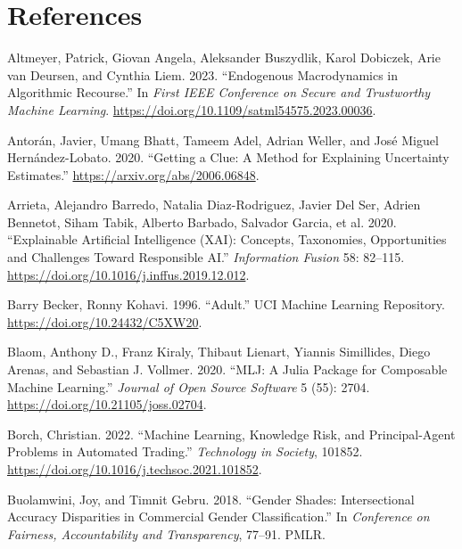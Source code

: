\documentclass{juliacon}
\newlength{\cslhangindent}
\newenvironment{CSLReferences}[2] %
 {\begin{list}{}{%
  \setlength{\itemindent}{0pt}
  \setlength{\leftmargin}{0pt}
  \setlength{\parsep}{0pt}
  \ifodd #1
   \setlength{\leftmargin}{\cslhangindent}
   \setlength{\itemindent}{-1\cslhangindent}
  \fi
  \setlength{\itemsep}{#2\baselineskip}}}
 {\end{list}}
\begin{document}
\section*{References}\label{references}

\label{refs}
\begin{CSLReferences}{1}{0}
Altmeyer, Patrick, Giovan Angela, Aleksander Buszydlik, Karol Dobiczek,
Arie van Deursen, and Cynthia Liem. 2023. {``Endogenous {Macrodynamics}
in {Algorithmic} {Recourse}.''} In \emph{First {IEEE} {Conference} on
{Secure} and {Trustworthy} {Machine} {Learning}}.
\url{https://doi.org/10.1109/satml54575.2023.00036}.

Antorán, Javier, Umang Bhatt, Tameem Adel, Adrian Weller, and José
Miguel Hernández-Lobato. 2020. {``Getting a Clue: {A} Method for
Explaining Uncertainty Estimates.''}
\url{https://arxiv.org/abs/2006.06848}.

Arrieta, Alejandro Barredo, Natalia Diaz-Rodriguez, Javier Del Ser,
Adrien Bennetot, Siham Tabik, Alberto Barbado, Salvador Garcia, et al.
2020. {``Explainable {Artificial Intelligence} ({XAI}): {Concepts},
Taxonomies, Opportunities and Challenges Toward Responsible {AI}.''}
\emph{Information Fusion} 58: 82--115.
\url{https://doi.org/10.1016/j.inffus.2019.12.012}.

Barry Becker, Ronny Kohavi. 1996. {``Adult.''} UCI Machine Learning
Repository. \url{https://doi.org/10.24432/C5XW20}.

Blaom, Anthony D., Franz Kiraly, Thibaut Lienart, Yiannis Simillides,
Diego Arenas, and Sebastian J. Vollmer. 2020. {``{MLJ}: {A Julia}
Package for Composable Machine Learning.''} \emph{Journal of Open Source
Software} 5 (55): 2704. \url{https://doi.org/10.21105/joss.02704}.

Borch, Christian. 2022. {``Machine Learning, Knowledge Risk, and
Principal-Agent Problems in Automated Trading.''} \emph{Technology in
Society}, 101852. \url{https://doi.org/10.1016/j.techsoc.2021.101852}.

Buolamwini, Joy, and Timnit Gebru. 2018. {``Gender Shades:
{Intersectional} Accuracy Disparities in Commercial Gender
Classification.''} In \emph{Conference on Fairness, Accountability and
Transparency}, 77--91. {PMLR}.


\end{CSLReferences}
\end{document}
